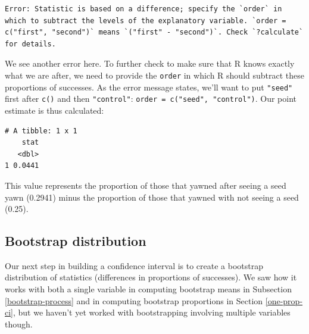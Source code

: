 \documentclass[12pt,]{krantz}
\makeatletter
\newenvironment{Shaded}{\begin{snugshade}}{\end{snugshade}}
\newcommand{\KeywordTok}[1]{\textcolor[rgb]{0.27,0.27,0.27}{\textbf{#1}}}
\newcommand{\DataTypeTok}[1]{\textcolor[rgb]{0.27,0.27,0.27}{#1}}
\newcommand{\StringTok}[1]{\textcolor[rgb]{0.5,0.5,0.5}{#1}}
\newcommand{\OperatorTok}[1]{\textcolor[rgb]{0.43,0.43,0.43}{\textbf{#1}}}
\newcommand{\NormalTok}[1]{#1}
\newenvironment{kframe}{%
\medskip{}
\setlength{\fboxsep}{.8em}
 \def\at@end@of@kframe{}%
 \ifinner\ifhmode%
  \def\at@end@of@kframe{\end{minipage}}%
  \begin{minipage}{\columnwidth}%
 \fi\fi%
 \def\FrameCommand##1{\hskip\@totalleftmargin \hskip-\fboxsep
 \colorbox{shadecolor}{##1}\hskip-\fboxsep
     \hskip-\linewidth \hskip-\@totalleftmargin \hskip\columnwidth}%
 \MakeFramed {\advance\hsize-\width
   \@totalleftmargin\z@ \linewidth\hsize
   \@setminipage}}%
 {\par\unskip\endMakeFramed%
 \at@end@of@kframe}
\renewenvironment{Shaded}{\begin{kframe}}{\end{kframe}}
\theoremstyle{definition}
\theoremstyle{definition}
\theoremstyle{definition}
\theoremstyle{remark}
\makeatother
\begin{document}
\begin{verbatim}
Error: Statistic is based on a difference; specify the `order` in which to subtract the levels of the explanatory variable. `order = c("first", "second")` means `("first" - "second")`. Check `?calculate` for details.
\end{verbatim}

We see another error here. To further check to make sure that R knows
exactly what we are after, we need to provide the \texttt{order} in
which R should subtract these proportions of successes. As the error
message states, we'll want to put \texttt{"seed"} first after
\texttt{c()} and then \texttt{"control"}:
\texttt{order\ =\ c("seed",\ "control")}. Our point estimate is thus
calculated:

\begin{Shaded}
\end{Shaded}

\begin{verbatim}
# A tibble: 1 x 1
    stat
   <dbl>
1 0.0441
\end{verbatim}

This value represents the proportion of those that yawned after seeing a
seed yawn (0.2941) minus the proportion of those that yawned with not
seeing a seed (0.25).

\subsection{Bootstrap distribution}\label{bootstrap-distribution-2}

Our next step in building a confidence interval is to create a bootstrap
distribution of statistics (differences in proportions of successes). We
saw how it works with both a single variable in computing bootstrap
means in Subsection \ref{bootstrap-process} and in computing bootstrap
proportions in Section \ref{one-prop-ci}, but we haven't yet worked with
bootstrapping involving multiple variables though.
\end{document}
